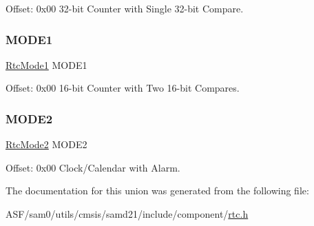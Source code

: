 Offset\+: 0x00 32-\/bit Counter with Single 32-\/bit Compare. 

\mbox{\label{union_rtc_af01b4de34aea9016b3e06fe48dc86c7a}} 
\subsubsection{\texorpdfstring{MODE1}{MODE1}}
{\footnotesize\ttfamily \mbox{\hyperlink{struct_rtc_mode1}{Rtc\+Mode1}} M\+O\+D\+E1}



Offset\+: 0x00 16-\/bit Counter with Two 16-\/bit Compares. 

\mbox{\label{union_rtc_a8a9d81cb0c4e27522805b10cd2c4bb76}} 
\subsubsection{\texorpdfstring{MODE2}{MODE2}}
{\footnotesize\ttfamily \mbox{\hyperlink{struct_rtc_mode2}{Rtc\+Mode2}} M\+O\+D\+E2}



Offset\+: 0x00 Clock/\+Calendar with Alarm. 



The documentation for this union was generated from the following file\+:\begin{DoxyCompactItemize}
\item 
A\+S\+F/sam0/utils/cmsis/samd21/include/component/\mbox{\hyperlink{component_2rtc_8h}{rtc.\+h}}\end{DoxyCompactItemize}
